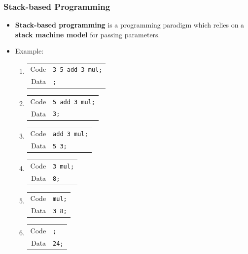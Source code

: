 \documentclass{beamer}
\begin{document}
\begin{frame}[fragile]
  \frametitle{Stack-based Programming}
  \begin{itemize}
  \item \textbf{Stack-based programming} is a programming paradigm which relies
    on a \textbf{stack machine model} for passing parameters.
  \item Example:
    \begin{enumerate}
    \item
      \begin{tabular}{rl}
        Code &\texttt{3 5 add 3 mul;} \\
        Data &\texttt{;} \\
      \end{tabular}
    \item
      \begin{tabular}{rl}
        Code &\texttt{5 add 3 mul;} \\
        Data &\texttt{3;} \\
      \end{tabular}
    \item
      \begin{tabular}{rl}
        Code &\texttt{add 3 mul;} \\
        Data &\texttt{5 3;} \\
      \end{tabular}
    \item
      \begin{tabular}{rl}
        Code &\texttt{3 mul;} \\
        Data &\texttt{8;} \\
      \end{tabular}
    \item
      \begin{tabular}{rl}
        Code &\texttt{mul;} \\
        Data &\texttt{3 8;} \\
      \end{tabular}
    \item
      \begin{tabular}{rl}
        Code &\texttt{;} \\
        Data &\texttt{24;} \\
      \end{tabular}
    \end{enumerate}
  \end{itemize}
\end{frame}
\end{document}
